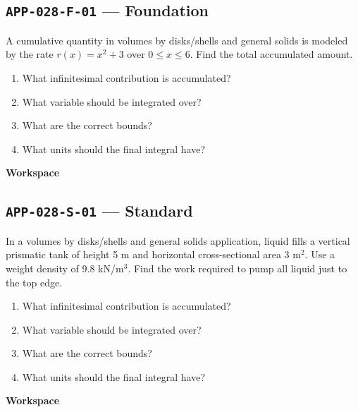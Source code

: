 \documentclass[11pt]{book}
\newcommand{\pid}[1]{\texttt{#1}}
\newcommand{\workspace}{\par\vspace{0.7in}\hrulefill\par\vspace{0.55in}\hrulefill\par}
\begin{document}
\subsection*{\pid{APP-028-F-01} — Foundation}
\begin{problembox}
A cumulative quantity in volumes by disks/shells and general solids is modeled by the rate $r(x)=x^2+3$ over $0\le x\le 6$. Find the total accumulated amount.
\end{problembox}
\begin{promptbox}\begin{enumerate}
\item What infinitesimal contribution is accumulated?
\item What variable should be integrated over?
\item What are the correct bounds?
\item What units should the final integral have?
\end{enumerate}\end{promptbox}
\textbf{Workspace}\workspace
{}
\subsection*{\pid{APP-028-S-01} — Standard}
\begin{problembox}
In a volumes by disks/shells and general solids application, liquid fills a vertical prismatic tank of height 5 m and horizontal cross-sectional area 3 m$^2$. Use a weight density of 9.8 kN/m$^3$. Find the work required to pump all liquid just to the top edge.
\end{problembox}
\begin{promptbox}\begin{enumerate}
\item What infinitesimal contribution is accumulated?
\item What variable should be integrated over?
\item What are the correct bounds?
\item What units should the final integral have?
\end{enumerate}\end{promptbox}
\textbf{Workspace}\workspace
{}
\end{document}
